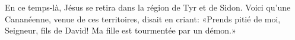 En ce temps-là, Jésus se retira dans la région de Tyr et de Sidon.
Voici qu’une Cananéenne, venue de ces territoires, disait en criant:
	«Prends pitié de moi, Seigneur, fils de David!
	Ma fille est tourmentée par un démon.»
